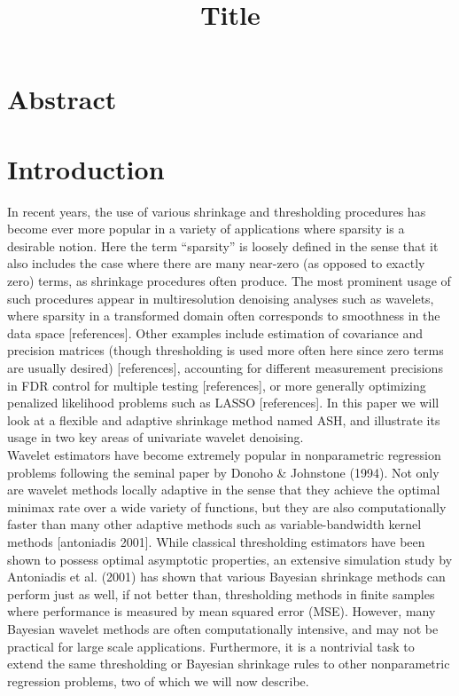 \documentclass[12pt]{article}
\begin{document}
\title{\textbf{Title}}
\date{}
\maketitle

\section{Abstract}
\section{Introduction}
In recent years, the use of various shrinkage and thresholding procedures has become ever more popular in a variety of applications where sparsity is a desirable notion. Here the term ``sparsity'' is loosely defined in the sense that it also includes the case where there are many near-zero (as opposed to exactly zero) terms, as shrinkage procedures often produce. The most prominent usage of such procedures appear in multiresolution denoising analyses such as wavelets, where sparsity in a transformed domain often corresponds to smoothness in the data space [references]. Other examples include estimation of covariance and precision matrices (though thresholding is used more often here since zero terms are usually desired) [references], accounting for different measurement precisions in FDR control for multiple testing [references], or more generally optimizing penalized likelihood problems such as LASSO [references]. In this paper we will look at a flexible and adaptive shrinkage method named ASH, and illustrate its usage in two key areas of univariate wavelet denoising.\bigskip\\
Wavelet estimators have become extremely popular in nonparametric regression problems following the seminal paper by Donoho \& Johnstone (1994). Not only are wavelet methods locally adaptive in the sense that they achieve the optimal minimax rate over a wide variety of functions, but they are also computationally faster than many other adaptive methods such as variable-bandwidth kernel methods [antoniadis 2001]. While classical thresholding estimators have been shown to possess optimal asymptotic properties, an extensive simulation study by Antoniadis et al. (2001) has shown that various Bayesian shrinkage methods can perform just as well, if not better than, thresholding methods in finite samples where performance is measured by mean squared error (MSE). However, many Bayesian wavelet methods are often computationally intensive, and may not be practical for large scale applications. Furthermore, it is a nontrivial task to extend the same thresholding or Bayesian shrinkage rules to other nonparametric regression problems, two of which we will now describe.\bigskip\\
\end{document}
